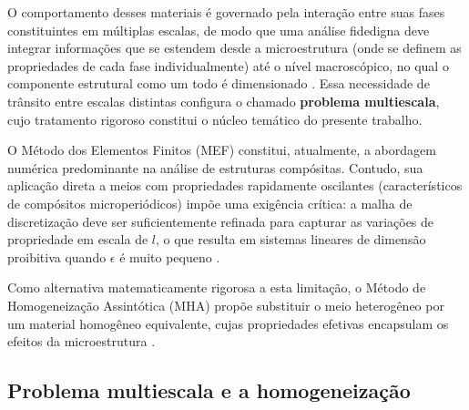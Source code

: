 O comportamento desses materiais é governado pela interação entre suas fases constituintes em múltiplas escalas, de modo que uma análise fidedigna deve integrar informações que se estendem desde a microestrutura  (onde se definem as propriedades de cada fase individualmente)  até o nível macroscópico, no qual o componente estrutural como um todo é dimensionado \cite{PartonReport}. Essa necessidade de trânsito entre escalas distintas configura o chamado \textbf{problema multiescala}, cujo tratamento rigoroso constitui o núcleo temático do presente trabalho.

O Método dos Elementos Finitos (MEF) constitui, atualmente, a abordagem numérica predominante na análise de estruturas compósitas. Contudo, sua aplicação direta a meios com propriedades rapidamente oscilantes  (característicos de compósitos microperiódicos) impõe uma exigência crítica: a malha de discretização deve ser suficientemente refinada para capturar as variações de propriedade em escala de $l$, o que resulta em sistemas lineares de dimensão proibitiva quando $\epsilon$ é muito pequeno \cite{Guinovart2024}.

Como alternativa matematicamente rigorosa a esta limitação, o Método de Homogeneização Assintótica (MHA) propõe substituir o meio heterogêneo por um material homogêneo equivalente, cujas propriedades efetivas encapsulam os efeitos da microestrutura \cite{bakhvalov1989}.

\subsection{Problema multiescala e a homogeneização}

